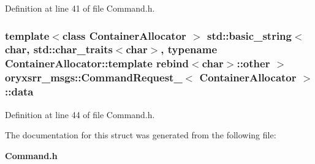 \-Definition at line 41 of file \-Command.\-h.

\subsubsection[{data}]{\setlength{\rightskip}{0pt plus 5cm}template$<$class Container\-Allocator $>$ std\-::basic\-\_\-string$<$char, std\-::char\-\_\-traits$<$char$>$, typename \-Container\-Allocator\-::template rebind$<$char$>$\-::other $>$ {\bf oryxsrr\-\_\-msgs\-::\-Command\-Request\-\_\-}$<$ \-Container\-Allocator $>$\-::{\bf data}}\label{structoryxsrr__msgs_1_1CommandRequest___ac79336d3eb87c243ed325a551b923529}


\-Definition at line 44 of file \-Command.\-h.



\-The documentation for this struct was generated from the following file\-:\begin{DoxyCompactItemize}
\item 
{\bf \-Command.\-h}\end{DoxyCompactItemize}
